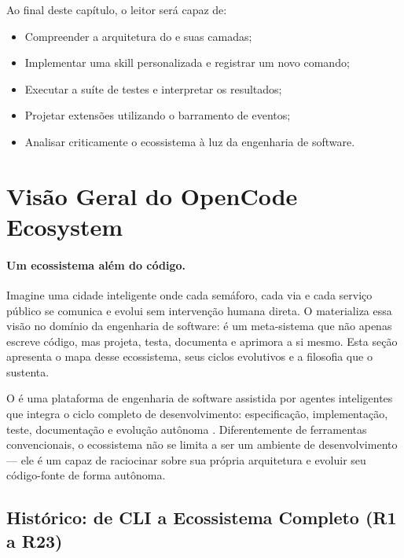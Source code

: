 \noindent Ao final deste capítulo, o leitor será capaz de:
\begin{itemize}
\item Compreender a arquitetura do \opencodeeco{} e suas camadas;
\item Implementar uma skill personalizada e registrar um novo comando;
\item Executar a suíte de testes e interpretar os resultados;
\item Projetar extensões utilizando o barramento de eventos;
\item Analisar criticamente o ecossistema à luz da engenharia de software.
\end{itemize}

\section{Visão Geral do OpenCode Ecosystem}
\label{sec:visao-geral}
\nivelzero

\paragraph{Um ecossistema além do código.} Imagine uma cidade inteligente onde cada semáforo, cada via e cada serviço público se comunica e evolui sem intervenção humana direta. O \opencodeeco{} materializa essa visão no domínio da engenharia de software: é um meta-sistema que não apenas escreve código, mas projeta, testa, documenta e aprimora a si mesmo. Esta seção apresenta o mapa desse ecossistema, seus ciclos evolutivos e a filosofia que o sustenta.

O \opencodeeco{} é uma plataforma de engenharia de software assistida por
agentes inteligentes que integra o ciclo completo de desenvolvimento:
especificação, implementação, teste, documentação e evolução autônoma
\cite{opencode2026ecosystem, laranjeira2026opencode}. Diferentemente de
ferramentas convencionais, o ecossistema não se limita a ser um ambiente
de desenvolvimento --- ele é um  capaz de raciocinar
sobre sua própria arquitetura e evoluir seu código-fonte de forma autônoma.

\subsection{Histórico: de CLI a Ecossistema Completo (R1 a R23)}
\label{subsec:historico}


